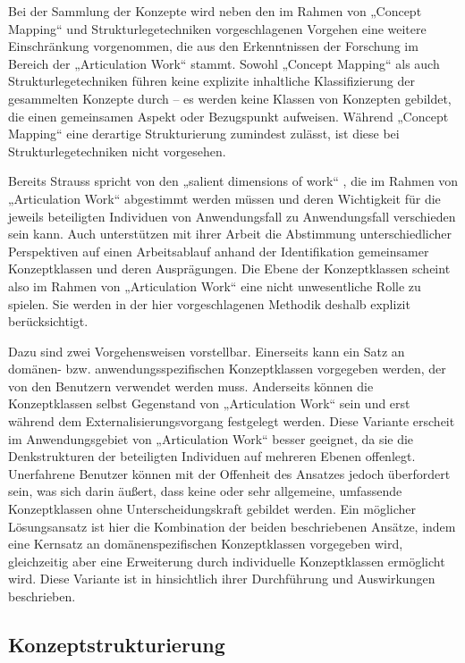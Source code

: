 Bei der Sammlung der Konzepte wird neben den im Rahmen von „Concept Mapping“ und Strukturlegetechniken vorgeschlagenen Vorgehen eine weitere Einschränkung vorgenommen, die aus den Erkenntnissen der Forschung im Bereich der „Articulation Work“ stammt. Sowohl „Concept Mapping“ als auch Strukturlegetechniken führen keine explizite inhaltliche Klassifizierung der gesammelten Konzepte durch -- es werden keine Klassen von Konzepten gebildet, die einen gemeinsamen Aspekt oder Bezugspunkt aufweisen. Während „Concept Mapping“ eine derartige Strukturierung zumindest zulässt, ist diese bei Strukturlegetechniken nicht vorgesehen.

Bereits Strauss spricht von den „salient dimensions of work“ \citep[][S.5]{Fjuk97}, die im Rahmen von „Articulation Work“ abgestimmt werden müssen und deren Wichtigkeit für die jeweils beteiligten Individuen von Anwendungsfall zu Anwendungsfall verschieden sein kann. Auch \citet{Sarini02} unterstützen mit ihrer Arbeit die Abstimmung unterschiedlicher Perspektiven auf einen Arbeitsablauf anhand der Identifikation gemeinsamer Konzeptklassen und deren Ausprägungen. Die Ebene der Konzeptklassen scheint also im Rahmen von „Articulation Work“ eine nicht unwesentliche Rolle zu spielen. Sie werden in der hier vorgeschlagenen Methodik deshalb explizit berücksichtigt. 

Dazu sind zwei Vorgehensweisen vorstellbar. Einerseits kann ein Satz an domänen- bzw. anwendungsspezifischen Konzeptklassen vorgegeben werden, der von den Benutzern verwendet werden muss. Anderseits können die Konzeptklassen selbst Gegenstand von „Articulation Work“ sein und erst während dem Externalisierungsvorgang festgelegt werden. Diese Variante erscheit im Anwendungsgebiet von „Articulation Work“ besser geeignet, da sie die Denkstrukturen der beteiligten Individuen auf mehreren Ebenen offenlegt. Unerfahrene Benutzer können mit der Offenheit des Ansatzes jedoch überfordert sein, was sich darin äußert, dass keine oder sehr allgemeine, umfassende Konzeptklassen ohne Unterscheidungskraft gebildet werden. Ein möglicher Lösungsansatz ist hier die Kombination der beiden beschriebenen Ansätze, indem eine Kernsatz an domänenspezifischen Konzeptklassen vorgegeben wird, gleichzeitig aber eine Erweiterung durch individuelle Konzeptklassen ermöglicht wird. Diese Variante ist in \citet{Oppl05} hinsichtlich ihrer Durchführung und Auswirkungen beschrieben. 

\subsection{Konzeptstrukturierung}

